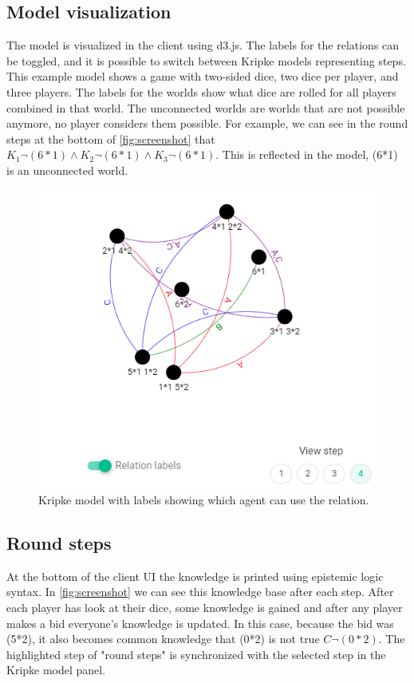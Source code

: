 \documentclass{article}
\begin{document}
\subsection*{Model visualization} %
The model is visualized in the client using d3.js. The labels for the relations can be toggled, and it is possible to switch between Kripke models representing steps. This example model shows a game with two-sided dice, two dice per player, and three players. The labels for the worlds show what dice are rolled for all players combined in that world. The unconnected worlds are worlds that are not possible anymore, no player considers them possible. For example, we can see in the round steps at the bottom of \autoref{fig:screenshot} that $K_1 \neg (6*1) \land K_2 \neg (6*1) \land K_3 \neg (6*1)$. This is reflected in the model, (6*1) is an unconnected world.

\begin{figure}[h]
    \includegraphics[width=.5\textwidth]{img/withrelations.png}
    \centering
    \caption{Kripke model with labels showing which agent can use the relation.}
    \label{fig:screenshot}
\end{figure}

\subsection*{Round steps}
At the bottom of the client UI the knowledge is printed using epistemic logic syntax. In \autoref{fig:screenshot} we can see this knowledge base after each step. After each player has look at their dice, some knowledge is gained and after any player makes a bid everyone's knowledge is updated. In this case, because the bid was (5*2), it also becomes common knowledge that (0*2) is not true $C \neg(0*2)$. The highlighted step of "round steps" is synchronized with the selected step in the Kripke model panel.
\end{document}
